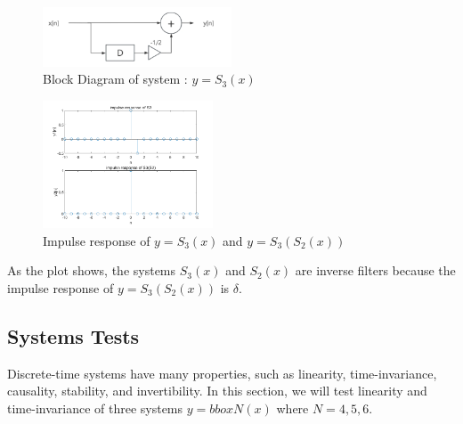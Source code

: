 \documentclass[journal]{IEEEtran}
\begin{document}
\begin{figure}[H]
   \centering
   \includegraphics[width=0.5\textwidth]{S3.png} %
   \caption{Block Diagram of system : $y=S_{3}(x)$}
   \label{fig:S3} 
\end{figure}
\begin{figure}[H]
   \centering
   \includegraphics[width=0.45\textwidth]{2.6.png} %
   \caption{Impulse response of $y=S_{3}(x)$ and $y=S_{3}(S_{2}(x))$}
   \label{fig:2.6}
\end{figure}

As the plot shows, the systems $S_{3}(x)$ and $S_{2}(x)$ are inverse filters because the impulse response of $y=S_{3}(S_{2}(x))$ is $\delta$.

\subsection{Systems Tests}
Discrete-time systems have many properties, such as linearity, time-invariance, causality, stability, and invertibility. In this section, we will test linearity and time-invariance of three systems $y=bboxN(x)$ where $N=4,5,6$.
\end{document}
